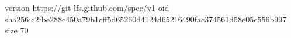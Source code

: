 version https://git-lfs.github.com/spec/v1
oid sha256:c2fbe288c450a79b1cff5d65260d4124d65216490fac374561d58e05c556b997
size 70
